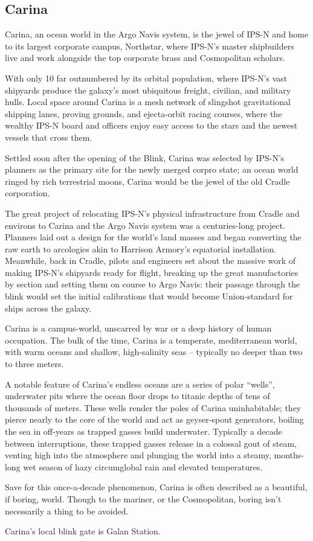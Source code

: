 \subsection{Carina}

Carina, an ocean world in the Argo Navis system, is the jewel of IPS-N and home to its largest
corporate campus, Northstar, where IPS-N’s master shipbuilders live and work alongside the top
corporate brass and Cosmopolitan scholars.

With only 10%
far outnumbered by its orbital population, where IPS-N’s vast shipyards produce the galaxy’s most
ubiquitous freight, civilian, and military hulls. Local space around Carina is a mesh network of
slingshot gravitational shipping lanes, proving grounds, and ejecta-orbit racing courses, where the
wealthy IPS-N board and officers enjoy easy access to the stars and the newest vessels that
cross them.

Settled soon after the opening of the Blink, Carina was selected by IPS-N’s planners as the
primary site for the newly merged corpro state; an ocean world ringed by rich terrestrial moons,
Carina would be the jewel of the old Cradle corporation.

The great project of relocating IPS-N’s physical infrastructure from Cradle and environs to Carina
and the Argo Navis system was a centuries-long project. Planners laid out a design for the world’s
land masses and began converting the raw earth to arcologies akin to Harrison Armory’s
equatorial installation. Meanwhile, back in Cradle, pilots and engineers set about the massive
work of making IPS-N’s shipyards ready for flight, breaking up the great manufactories by section
and setting them on course to Argo Navis: their passage through the blink would set the initial
calibrations that would become Union-standard for ships across the galaxy.

Carina is a campus-world, unscarred by war or a deep history of human occupation. The bulk of
the time, Carina is a temperate, mediterranean world, with warm oceans and shallow, high-salinity
seas -- typically no deeper than two to three meters.

A notable feature of Carina’s endless oceans are a series of polar ``wells'', underwater pits where
the ocean floor drops to titanic depths of tens of thousands of meters. These wells render the
poles of Carina uninhabitable; they pierce nearly to the core of the world and act as geyser-spout
generators, boiling the sea in off-years as trapped gasses build underwater. Typically a decade
between interruptions, these trapped gasses release in a colossal gout of steam, venting high into
the atmosphere and plunging the world into a steamy, months-long wet season of hazy
circumglobal rain and elevated temperatures.

Save for this once-a-decade phenomenon, Carina is often described as a beautiful, if boring,
world. Though to the mariner, or the Cosmopolitan, boring isn’t necessarily a thing to be avoided.

Carina’s local blink gate is Galan Station.